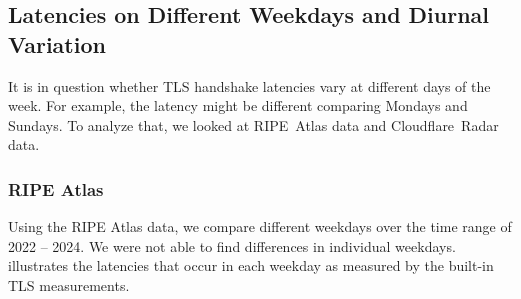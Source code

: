 \subsection{Latencies on Different Weekdays and Diurnal Variation}
\label{sec:latency-weekdays}

It is in question whether TLS handshake latencies vary at different days of the
week. For example, the latency might be different comparing Mondays and
Sundays. To analyze that, we looked at RIPE~Atlas data and Cloudflare~Radar
data.

\subsubsection*{RIPE Atlas}

Using the RIPE Atlas data, we compare different weekdays over the time range of
2022 -- 2024. We were not able to find differences in individual weekdays.
 illustrates the latencies that occur in each
weekday as measured by the built-in TLS measurements.

